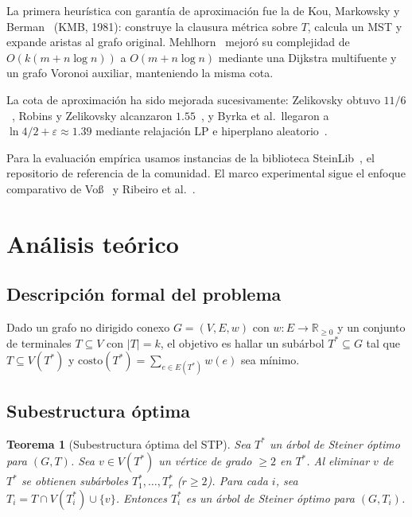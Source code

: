 \documentclass[11pt]{article}
\newtheorem{theorem}{Teorema}
\begin{document}
La primera heur\'istica con garant\'ia de aproximaci\'on fue la de
Kou, Markowsky y Berman~\cite{KouMarkowskyBerman1981} (KMB, 1981): construye
la clausura m\'etrica sobre $T$, calcula un MST y expande aristas al grafo
original.  Mehlhorn~\cite{Mehlhorn1988} mejor\'o su complejidad de
$O(k(m+n\log n))$ a $O(m+n\log n)$ mediante una Dijkstra multifuente y
un grafo Voronoi auxiliar, manteniendo la misma cota.

La cota de aproximaci\'on ha sido mejorada sucesivamente: Zelikovsky
obtuvo $11/6$~\cite{Zelikovsky1993}, Robins y Zelikovsky alcanzaron
$1.55$~\cite{RobinsZelikovsky2005}, y Byrka et al.\ llegaron a
$\ln 4 / 2 + \varepsilon \approx 1.39$ mediante relajaci\'on LP e
hiperplano aleatorio~\cite{ByrkaGRS2010}.

Para la evaluaci\'on emp\'irica usamos instancias de la biblioteca
SteinLib~\cite{KochMartinVoss2001}, el repositorio de referencia de
la comunidad.  El marco experimental sigue el enfoque comparativo de
Vo\ss{}~\cite{Voss1992} y Ribeiro et al.~\cite{RibeiroUchoaWerneck2002}.

\section{An\'alisis te\'orico}\label{sec:theory}

\subsection{Descripci\'on formal del problema}

Dado un grafo no dirigido conexo $G=(V,E,w)$ con $w:E\to\mathbb{R}_{\ge 0}$
y un conjunto de terminales $T\subseteq V$ con $|T|=k$, el objetivo es hallar
un sub\'arbol $T^*\subseteq G$ tal que $T\subseteq V(T^*)$ y
$\mathrm{costo}(T^*)=\sum_{e\in E(T^*)}w(e)$ sea m\'inimo.

\subsection{Subestructura \'optima}\label{sec:substruct}

\begin{theorem}[Subestructura \'optima del STP]
Sea $T^*$ un \'arbol de Steiner \'optimo para $(G,T)$.  Sea $v\in V(T^*)$
un v\'ertice de grado $\ge 2$ en $T^*$.  Al eliminar $v$ de $T^*$ se obtienen
sub\'arboles $T^*_1,\ldots,T^*_r$ ($r\ge 2$).  Para cada $i$, sea
$T_i = T \cap V(T^*_i) \cup \{v\}$.  Entonces $T^*_i$ es un \'arbol de
Steiner \'optimo para $(G, T_i)$.
\end{theorem}
\end{document}
